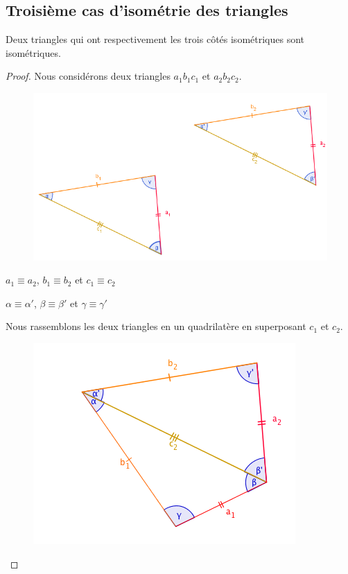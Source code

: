 \documentclass[a4paper,12pt]{article}
\begin{document}
\pagebreak
\subsection{Troisième cas d'isométrie des triangles}
\begin{theorem}
Deux triangles qui ont respectivement les trois côtés isométriques sont isométriques.
\end{theorem}
\begin{proof}
Nous considérons deux triangles $a_1b_1c_1$ et $a_2b_2c_2$.

\begin{figure}[H]
    \centering
    \includegraphics[scale=0.6]{theorems/isom3/Cas_3.PNG}
\end{figure}

 \begin{hyp}
     $a_1\equiv a_2$,
     $b_1\equiv b_2$ et
     $c_1\equiv c_2$
 \end{hyp}
 \begin{concl}
     $\alpha \equiv \alpha'$,
     $\beta \equiv \beta'$ et
     $\gamma \equiv \gamma'$
 \end{concl}
 Nous rassemblons les deux triangles en un quadrilatère en superposant $c_1$ et $c_2$. 
 
 \begin{figure}[H]
    \centering
    \includegraphics[scale=0.6]{theorems/isom3/Cas3_2.png}
\end{figure}
 

\end{proof}
\end{document}
